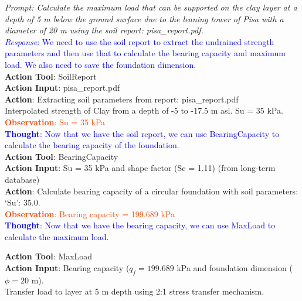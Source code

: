 \documentclass[12pt]{article}
\begin{document}
\noindent\textit{\textcolor{RedOrange}{Prompt: Calculate the maximum load that can be supported on the clay layer at a depth of 5 m below the ground surface due to the leaning tower of Pisa with a diameter of 20 m using the soil report: pisa\_report.pdf.}}
\\
\textcolor{blue}{\textit{Response}: We need to use the soil report to extract the undrained strength parameters and then use that to calculate the bearing capacity and maximum load. We also need to save the foundation dimension.}\\

\noindent\textcolor{OliveGreen}{
\textbf{Action Tool}: SoilReport \\
\textbf{Action Input}: pisa\_report.pdf \\
\textbf{Action}: Extracting soil parameters from report:  pisa\_report.pdf \\
Interpolated strength of Clay from a depth of -5 to -17.5 m asl. Su = 35 kPa.
}\\

\noindent \textcolor{OrangeRed}{\textbf{Observation}: Su = 35 kPa}\\

\noindent \textcolor{blue}{\textbf{Thought}: Now that we have the soil report, we can use BearingCapacity to calculate the bearing capacity of the foundation.}\\

\noindent\textcolor{OliveGreen}{
\textbf{Action Tool}: BearingCapacity\\
\textbf{Action Input}: Su = 35 kPa and shape factor (Sc = 1.11) (from long-term database)\\
\textbf{Action}: Calculate bearing capacity of a circular foundation with soil parameters:  {`Su': 35.0}.
}\\

\noindent\textcolor{OrangeRed}{\textbf{Observation}: Bearing capacity = 199.689 kPa}\\

\noindent \textcolor{blue}{\textbf{Thought}: Now that we have the bearing capacity, we can use MaxLoad to calculate the maximum load.}

\noindent\textcolor{OliveGreen}{
\textbf{Action Tool}: MaxLoad \\
\textbf{Action Input}: Bearing capacity ($q_f = 199.689$ kPa and foundation dimension ($\phi = 20 $ m).\\
Transfer load to layer at 5 m depth using 2:1 stress transfer mechanism.}\\
\end{document}
